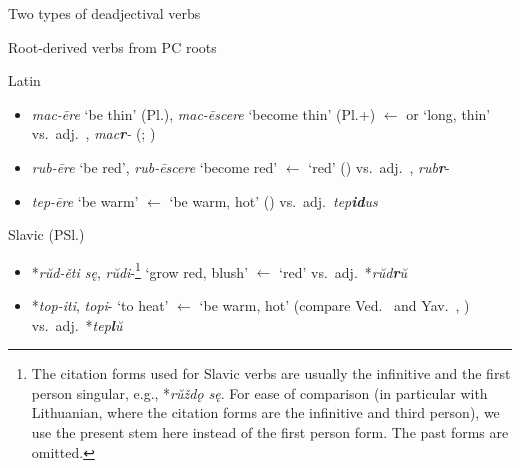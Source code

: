 \documentclass[output=paper,colorlinks,citecolor=brown]{langscibook}
\begin{document}
\begin{exe}
    \ex Two types of deadjectival verbs \label{ex:twotypes}
    \begin{xlist}
        \ex Root-derived verbs from PC roots \label{ex:deadj1}          
        \begin{xlist}
        \ex Latin \label{ex:latdeadj1}
                   \begin{itemize}
                       \item \textit{mac-ēre}  `be thin' (Pl.), \textit{mac-ēscere}  `become thin' (Pl.+) $\leftarrow$  or  `long, thin' vs.\ adj.\ , \textit{mac\textbf{r}-}  (\citealt[51]{Nussbaum1976}; )
                   \item  \textit{rub-ēre}  `be red', \textit{rub-ēscere}  `become red' $\leftarrow$  `red' () vs.\ adj.\ , \textit{rub\textbf{r}}-
                   \item \textit{tep-ēre}  `be warm' $\leftarrow$  `be warm, hot' () vs.\ adj.\ \textit{tep\textbf{id}us}
                   \end{itemize}
        \ex Slavic (PSl.)\label{ex:slavdeadj1}
        \begin{itemize}
            \item  *\textit{rŭd-ěti sę},  \textit{rŭdi}-\footnote{The citation forms used for Slavic verbs are usually the infinitive and the first person singular, e.g., *\textit{rŭždǫ sę}. For ease of comparison (in particular with Lithuanian, where the citation forms are the infinitive and third person), we use the present stem here instead of the first person form. The past forms are omitted.} `grow red, blush' $\leftarrow$  `red' vs.\ adj.\ *\textit{rŭd\textbf{r}ŭ}
                   \item  *\textit{top-iti},  \textit{topi}- `to heat' $\leftarrow$  `be warm, hot' (compare Ved.\  and Yav.\ , ) vs.\ adj.\ *\textit{tep\textbf{l}ŭ}

\end{itemize}
\end{xlist}
\end{xlist}
\end{exe}
\end{document}
